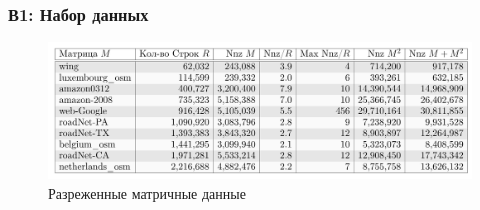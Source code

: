 \documentclass[aspectratio=169,xcolor=table,english]{beamer}
\begin{document}
\begin{frame}[fragile] \frametitle{В1: Набор данных}
    \begin{center}
     \begin{minipage}[m]{0.9\linewidth}
        \begin{figure}
            \centering
            \includegraphics[width=1.0\textwidth]{figures/dataset_rq1.png}
            \caption{Разреженные матричные данные}
        \end{figure}
    \end{minipage}\hfill   
    \end{center}
\end{frame}
\end{document}
